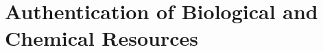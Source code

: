 \documentclass[../main.tex]{subfiles}
\begin{document}

\section*{Authentication of Biological and Chemical Resources}

\lipsum
\end{document}
